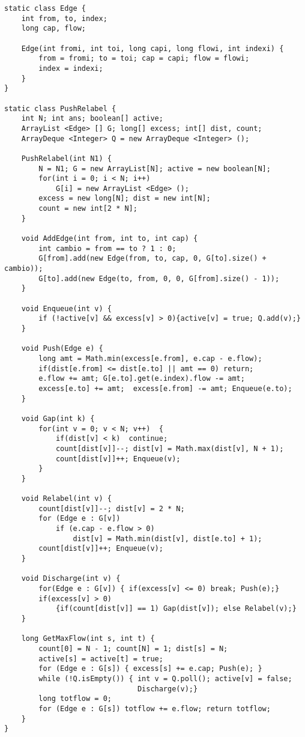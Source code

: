 \documentclass[10pt,letterpaper,twocolumn,twosided]{article}
\begin{document}
\begin{lstlisting}
static class Edge {
    int from, to, index;
    long cap, flow;

    Edge(int fromi, int toi, long capi, long flowi, int indexi) {
        from = fromi; to = toi; cap = capi; flow = flowi; 
        index = indexi;
    }
}

static class PushRelabel {
    int N; int ans; boolean[] active;
    ArrayList <Edge> [] G; long[] excess; int[] dist, count;
    ArrayDeque <Integer> Q = new ArrayDeque <Integer> ();

    PushRelabel(int N1) {
        N = N1; G = new ArrayList[N]; active = new boolean[N];
        for(int i = 0; i < N; i++)
            G[i] = new ArrayList <Edge> ();
        excess = new long[N]; dist = new int[N]; 
        count = new int[2 * N];
    }
    
    void AddEdge(int from, int to, int cap) {
        int cambio = from == to ? 1 : 0;
        G[from].add(new Edge(from, to, cap, 0, G[to].size() + cambio));
        G[to].add(new Edge(to, from, 0, 0, G[from].size() - 1));
    }

    void Enqueue(int v) { 
        if (!active[v] && excess[v] > 0){active[v] = true; Q.add(v);} 
    }

    void Push(Edge e) {
        long amt = Math.min(excess[e.from], e.cap - e.flow);
        if(dist[e.from] <= dist[e.to] || amt == 0) return;
        e.flow += amt; G[e.to].get(e.index).flow -= amt;
        excess[e.to] += amt;  excess[e.from] -= amt; Enqueue(e.to);
    }

    void Gap(int k) {
        for(int v = 0; v < N; v++)  {
            if(dist[v] < k)  continue;
            count[dist[v]]--; dist[v] = Math.max(dist[v], N + 1);
            count[dist[v]]++; Enqueue(v);
        }
    }

    void Relabel(int v) {
        count[dist[v]]--; dist[v] = 2 * N;
        for (Edge e : G[v]) 
            if (e.cap - e.flow > 0) 
                dist[v] = Math.min(dist[v], dist[e.to] + 1);
        count[dist[v]]++; Enqueue(v);
    }

    void Discharge(int v) {
        for(Edge e : G[v]) { if(excess[v] <= 0) break; Push(e);}
        if(excess[v] > 0) 
            {if(count[dist[v]] == 1) Gap(dist[v]); else Relabel(v);}
    }

    long GetMaxFlow(int s, int t) {
        count[0] = N - 1; count[N] = 1; dist[s] = N; 
        active[s] = active[t] = true;
        for (Edge e : G[s]) { excess[s] += e.cap; Push(e); }
        while (!Q.isEmpty()) { int v = Q.poll(); active[v] = false; 
                               Discharge(v);}
        long totflow = 0;
        for (Edge e : G[s]) totflow += e.flow; return totflow;
    }
}
\end{lstlisting}
\end{document}

